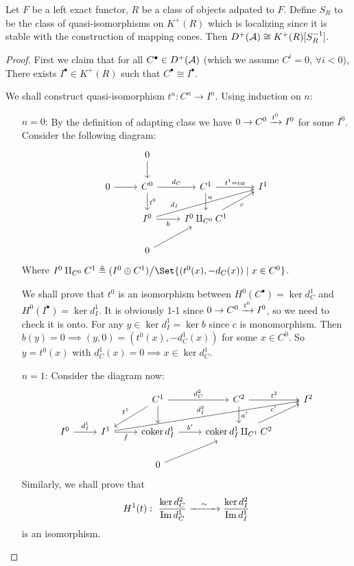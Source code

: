 \begin{theorem}
  Let $F$ be a left exact functor, $R$ be a class of objects adpated to $F$.
  Define $S_R$ to be the class of quasi-isomorphisms on $K^+(R)$
  which is localizing since it is stable with the construction
  of mapping cones. Then $D^+(\mathcal{A}) \cong K^+(R)[S_R^{-1}]$.

  \begin{proof}
    First we claim that for all $C^\bullet \in D^+(\mathcal{A})$ (which
    we assume $C^i = 0, \, \forall i < 0$),
    There exists $I^\bullet \in K^+(R)$ such that $C^\bullet \cong I^\bullet$.

    We shall construct quasi-isomorphism $t^n : C^n \to I^n$.
    Using induction on $n$:
    \begin{enumerate}
      \item[$n = 0$:] By the definition of adapting class we have
        $0 \to C^0 \xrightarrow{t^0} I^0$ for some $I^0$.
        Consider the following diagram:
        \[ \begin{tikzcd}
            & 0 \ar[d] & & \\
            0 \ar[r] & C^0 \ar[r, "d_C"] \ar[d, "t^0"] &
            C^1 \ar[r, "t^1 = c a"] \ar[d, "a", near start] & I^1 \\
            & I^0 \ar[r, "b"'] \ar[rru, "d_I", near start] &
            I^0 \amalg_{C^0} C^1 \ar[ru, "c"'] & \\
            & 0 \ar[ru] & &
        \end{tikzcd} \]
      Where $I^0 \amalg_{C^0} C^1 \triangleq (I^0 \oplus C^1)
      \big/ \Set{(t^0(x), -d_C(x)) \mid x \in C^0}$.

      We shall prove that $t^0$ is an isomorphism
      between $H^0(C^\bullet) = \ker d^1_C$ and
      $H^0(I^\bullet) = \ker d^1_I$. It is
      obviously 1-1 since $0 \to C^0 \xrightarrow{t^0} I^0$,
      so we need to check it is onto. For any $y \in \ker d^1_I
      = \ker b$ since $c$ is monomorphism.
      Then $b(y) = 0 \implies (y, 0) = (t^0(x), -d^1_C(x))$
      for some $x \in C^0$. So $y = t^0(x)$
      with $d^1_C(x) = 0 \implies x \in \ker d^1_C$.

    \item [$n = 1$:] Consider the diagram now:
        \[ \begin{tikzcd}
            & & C^1 \ar[r, "d^2_C"] \ar[d] \ar[ld, "t^1"'] &
            C^2 \ar[r, "t^2"] \ar[d, "a'"] & I^2 \\
            I^0 \ar[r, "d_I^1"] &
            I^1 \ar[r, "f"'] \ar[rrru, "d_I^2"] &
            \coker d^1_I \ar[r, "b'"] &
            \coker d^1_I \amalg_{C^1} C^2 \ar[ru, "c'"] \\
            & & 0 \ar[ru] & &
        \end{tikzcd} \]
      Similarly, we shall prove that
      \[ H^1(t) : \ \frac{\ker d^2_C}{\operatorname{Im} d^1_C}
        \xrightarrow{\quad\sim\quad} \frac{\ker d^2_I}{\operatorname{Im} d^1_I} \]
      is an isomorphism.


\end{enumerate}
\end{proof}
\end{theorem}
